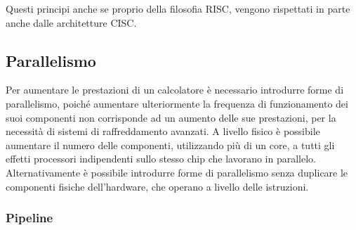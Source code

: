 \documentclass{article}
\numberwithin{equation}{subsection}
\begin{document}
Questi principi anche se proprio della filosofia RISC, vengono rispettati in parte anche dalle architetture CISC. 

\subsection{Parallelismo}

Per aumentare le prestazioni di un calcolatore è necessario introdurre forme di parallelismo, poiché aumentare ulteriormente la frequenza di funzionamento dei suoi componenti non corrisponde ad un aumento delle sue 
prestazioni, per la necessità di sistemi di raffreddamento avanzati. A livello fisico è possibile aumentare il numero delle componenti, utilizzando più di un core, a tutti gli effetti processori indipendenti sullo 
stesso chip che lavorano in parallelo. Alternativamente è possibile introdurre forme di parallelismo senza duplicare le componenti fisiche dell'hardware, che operano a livello delle istruzioni. 

\subsubsection{Pipeline}
\end{document}
